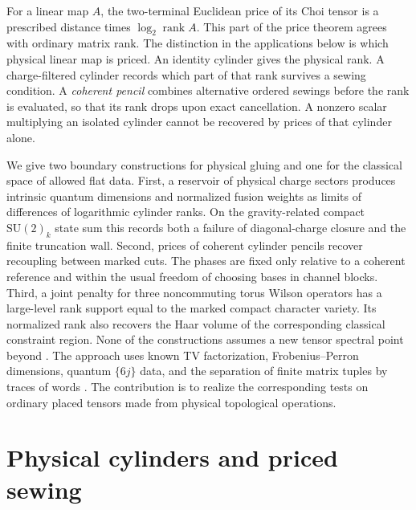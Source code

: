 \documentclass[11pt]{article}
\numberwithin{equation}{section}
\theoremstyle{definition}
\theoremstyle{remark}
\DeclareMathOperator{\rank}{rank}
\newcommand{\su}{\mathrm{SU}(2)_k}
\begin{document}
For a linear map \(A\), the two-terminal Euclidean price of its Choi tensor is a prescribed distance times \(\log_2\rank A\). This part of the price theorem agrees with ordinary matrix rank. The distinction in the applications below is which physical linear map is priced. An identity cylinder gives the physical rank. A charge-filtered cylinder records which part of that rank survives a sewing condition. A \emph{coherent pencil} combines alternative ordered sewings before the rank is evaluated, so that its rank drops upon exact cancellation. A nonzero scalar multiplying an isolated cylinder cannot be recovered by prices of that cylinder alone.

We give two boundary constructions for physical gluing and one for the classical space of allowed flat data. First, a reservoir of physical charge sectors produces intrinsic quantum dimensions and normalized fusion weights as limits of differences of logarithmic cylinder ranks. On the gravity-related compact \(\su\) state sum this records both a failure of diagonal-charge closure and the finite truncation wall. Second, prices of coherent cylinder pencils recover recoupling between marked cuts. The phases are fixed only relative to a coherent reference and within the usual freedom of choosing bases in channel blocks. Third, a joint penalty for three noncommuting torus Wilson operators has a large-level rank support equal to the marked compact character variety. Its normalized rank also recovers the Haar volume of the corresponding classical constraint region. None of the constructions assumes a new tensor spectral point beyond \cite{OpenAIPrice}. The approach uses known TV factorization, Frobenius--Perron dimensions, quantum \(\{6j\}\) data, and the separation of finite matrix tuples by traces of words \cite{EtingofNikshychOstrik,KauffmanLins,Procesi}. The contribution is to realize the corresponding tests on ordinary placed tensors made from physical topological operations.

\section{Physical cylinders and priced sewing}\label{sec:cylinder}
\end{document}
